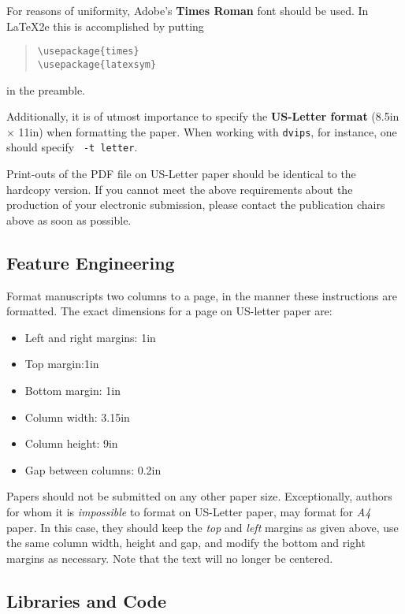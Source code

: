 \documentclass[11pt,letterpaper]{article}
\begin{document}
For reasons of uniformity, Adobe's {\bf Times Roman} font should be
used. In \LaTeX2e{} this is accomplished by putting

\begin{quote}
\begin{verbatim}
\usepackage{times}
\usepackage{latexsym}
\end{verbatim}
\end{quote}
in the preamble.

Additionally, it is of utmost importance to specify the {\bf
  US-Letter format} (8.5in $\times$ 11in) when formatting the paper.
When working with {\tt dvips}, for instance, one should specify {\tt
  -t letter}.

Print-outs of the PDF file on US-Letter paper should be identical to the
hardcopy version.  If you cannot meet the above requirements about the
production of your electronic submission, please contact the
publication chairs above  as soon as possible.


\subsection{Feature Engineering}
\label{ssec:layout}

Format manuscripts two columns to a page, in the manner these
instructions are formatted. The exact dimensions for a page on US-letter
paper are:

\begin{itemize}
\item Left and right margins: 1in
\item Top margin:1in
\item Bottom margin: 1in
\item Column width: 3.15in
\item Column height: 9in
\item Gap between columns: 0.2in
\end{itemize}

\noindent Papers should not be submitted on any other paper size. Exceptionally,
authors for whom it is \emph{impossible} to format on US-Letter paper,
may format for \emph{A4} paper. In this case, they should keep the \emph{top}
and \emph{left} margins as given above, use the same column width,
height and gap, and modify the bottom and right margins as necessary.
Note that the text will no longer be centered.

\subsection{Libraries and Code}
\label{ssec:first}
\end{document}
